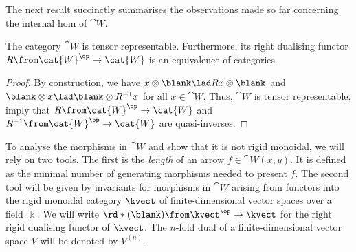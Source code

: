 The next result succinctly summarises the observations made so far concerning the internal hom of \(\cat{W}\).

\begin{lemma}\label{lemma:free-trep-cat}
  The category \(\cat{W}\) is tensor representable.
  Furthermore, its right dualising functor \(R\from \cat{W}^{\op}\to\cat{W}\) is an equivalence of categories.
\end{lemma}
\begin{proof}
  By construction, we have \(x \otimes \blank \lad Rx \otimes \blank\) and \(\blank \otimes x \lad \blank \otimes R^{-1}x\) for all \(x \in\cat{W}\).
  Thus, \(\cat{W}\) is tensor representable.
  imply that \(R \from\cat{W}^{\op} \to\cat{W}\) and \(R^{-1} \from\cat{W}^{\op} \to\cat{W}\) are quasi-inverses.
\end{proof}

To analyse the morphisms in \(\cat{W}\) and show that it is not rigid monoidal, we will rely on two tools.
The first is the \emph{length} of an arrow \(f\in \cat{W}(x,y)\).
It is defined as the minimal number of generating morphisms needed to present \(f\).
The second tool will be given by invariants for morphisms in \(\cat{W}\) arising from functors into the rigid monoidal category \(\kvect\) of finite\hyp{}dimensional vector spaces over a field \(\Bbbk\).
We will write \(\rd*{(\blank)} \from \kvect^{\op} \to \kvect\) for the right rigid dualising functor of \(\kvect\).
The \(n\)\hyp{}fold dual of a finite\hyp{}dimensional vector space \(V\) will be denoted by \(V^{(n)}\).

